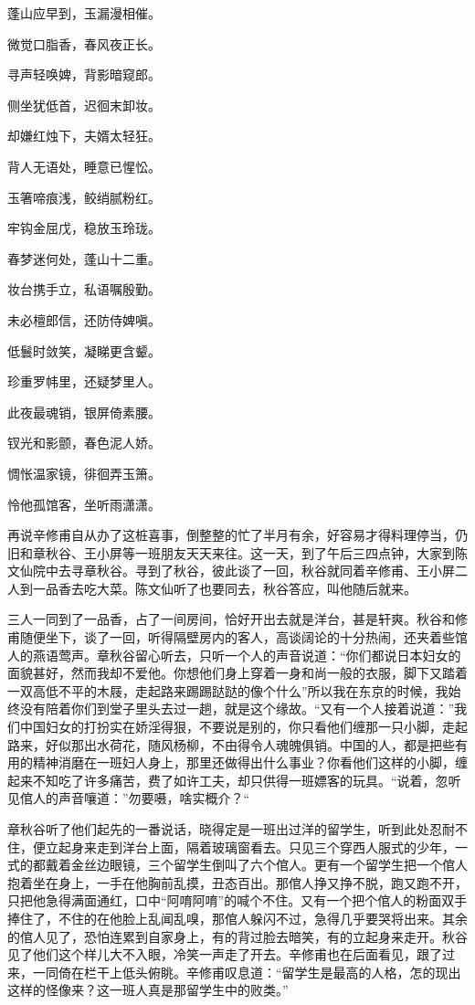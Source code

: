 \documentclass[12pt,UTF8]{ctexbook}
\begin{document}
{{{蓬山应早到，玉漏漫相催。

微觉口脂香，春风夜正长。

寻声轻唤婢，背影暗窥郎。

侧坐犹低首，迟徊末卸妆。

却嫌红烛下，夫婿太轻狂。

背人无语处，睡意已惺忪。

玉箸啼痕浅，鲛绡腻粉红。

牢钩金屈戊，稳放玉玲珑。

春梦迷何处，蓬山十二重。

妆台携手立，私语嘱殷勤。

未必檀郎信，还防侍婢嗔。

低鬟时敛笑，凝睇更含颦。

珍重罗帏里，还疑梦里人。

此夜最魂销，银屏倚素腰。

钗光和影颤，春色泥人娇。

惆怅温家镜，徘徊弄玉箫。

怜他孤馆客，坐听雨潇潇。

再说辛修甫自从办了这桩喜事，倒整整的忙了半月有余，好容易才得料理停当，仍旧和章秋谷、王小屏等一班朋友天天来往。这一天，到了午后三四点钟，大家到陈文仙院中去寻章秋谷。寻到了秋谷，彼此谈了一回，秋谷就同着辛修甫、王小屏二人到一品香去吃大菜。陈文仙听了也要同去，秋谷答应，叫他随后就来。

三人一同到了一品香，占了一间房间，恰好开出去就是洋台，甚是轩爽。秋谷和修甫随便坐下，谈了一回，听得隔壁房内的客人，高谈阔论的十分热闹，还夹着些馆人的燕语莺声。章秋谷留心听去，只听一个人的声音说道：“你们都说日本妇女的面貌甚好，然而我却不爱他。你想他们身上穿着一身和尚一般的衣服，脚下又踏着一双高低不平的木屐，走起路来踢踢跶跶的像个什么”所以我在东京的时候，我始终没有陪着你们到堂子里头去过一趟，就是这个缘故。“又有一个人接着说道：”我们中国妇女的打扮实在娇淫得狠，不要说是别的，你只看他们缠那一只小脚，走起路来，好似那出水荷花，随风杨柳，不由得令人魂魄俱销。中国的人，都是把些有用的精神消磨在一班妇人身上，那里还做得出什么事业？你看他们这样的小脚，缠起来不知吃了许多痛苦，费了如许工夫，却只供得一班嫖客的玩具。“说着，忽听见倌人的声音嚷道：”勿要嗫，啥实概介？“

章秋谷听了他们起先的一番说话，晓得定是一班出过洋的留学生，听到此处忍耐不住，便立起身来走到洋台上面，隔着玻璃窗看去。只见三个穿西人服式的少年，一式的都戴着金丝边眼镜，三个留学生倒叫了六个倌人。更有一个留学生把一个倌人抱着坐在身上，一手在他胸前乱摸，丑态百出。那倌人挣又挣不脱，跑又跑不开，只把他急得满面通红，口中“阿唷阿唷”的喊个不住。又有一个把个倌人的粉面双手捧住了，不住的在他脸上乱闻乱嗅，那倌人躲闪不过，急得几乎要哭将出来。其余的倌人见了，恐怕连累到自家身上，有的背过脸去暗笑，有的立起身来走开。秋谷见了他们这个样儿大不入眼，冷笑一声走了开去。辛修甫也在后面看见，跟了过来，一同倚在栏干上低头俯眺。辛修甫叹息道：“留学生是最高的人格，怎的现出这样的怪像来？这一班人真是那留学生中的败类。”

}}}
\end{document}
